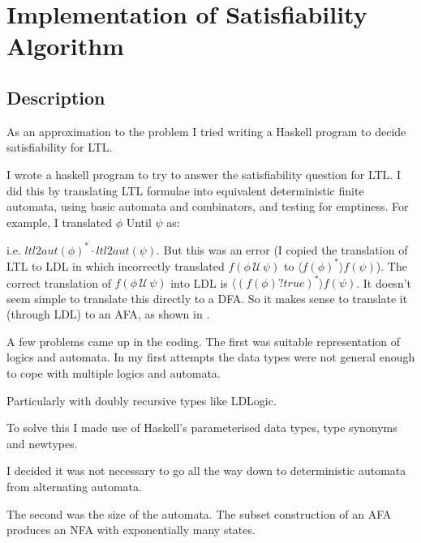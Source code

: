 
\section {Implementation of Satisfiability Algorithm}
\subsection{Description}

As an approximation to the problem I tried writing a Haskell program to decide satisfiability for LTL.

I wrote a haskell program to try to answer the satisfiability question for LTL.
I did this by translating LTL formulae into equivalent deterministic finite automata, using basic automata and combinators, and testing for emptiness. For example, I translated $\phi$ Until $\psi$ as:
i.e. $ ltl2aut(\phi)^* \cdot ltl2aut(\psi) $.
But this was an error (I copied the translation of LTL to LDL in \cite{ldlf} which incorrectly translated $ f(\phi \,  \, \psi) $ to $\langle f(\phi)^* \rangle f(\psi)$).
The correct translation of $ f(\phi \,  \, \psi) $ into LDL is $\langle (f(\phi)?true)^* \rangle f(\psi)$. It doesn't seem simple to translate this directly to a DFA. So it makes sense to translate it (through LDL) to an AFA, as shown in \cite{ldlf}.

\begin{comment}
Note: the code has since been reformulated and can be found on my
\href{https://github.com/passionfruit18/ldl_exposition}{github}.
\end{comment}

A few problems came up in the coding. The first was suitable representation of logics and automata. In my first attempts the data types were not general enough to cope with multiple logics and automata.

Particularly with doubly recursive types like LDLogic.

To solve this I made use of Haskell's parameterised data types, type synonyms and newtypes.

I decided it was not necessary to go all the way down to deterministic automata from alternating automata.

The second was the size of the automata. The subset construction of an AFA produces an NFA with exponentially many states.

